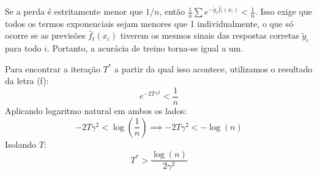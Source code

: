 

Se a perda é estritamente menor que $1/n$, então $\frac{1}{n} \sum e^{-\tilde{y}_i \hat{f}_t(x_i)} < \frac{1}{n}$.
Isso exige que todos os termos exponenciais sejam menores que 1 individualmente, o que só ocorre se as previsões $\hat{f}_t(x_i)$ tiverem os mesmos sinais das respostas corretas $\tilde{y}_i$ para todo $i$. Portanto, a acurácia de treino torna-se igual a um.

Para encontrar a iteração $T^*$ a partir da qual isso acontece, utilizamos o resultado da letra (f):
\begin{equation*}
    e^{-2T\gamma^2} < \frac{1}{n}
\end{equation*}
Aplicando logaritmo natural em ambos os lados:
\begin{equation*}
    -2T\gamma^2 < \log\left(\frac{1}{n}\right) \implies -2T\gamma^2 < -\log(n)
\end{equation*}
Isolando $T$:
\begin{equation*}
    T^* > \frac{\log(n)}{2\gamma^2}
\end{equation*}
